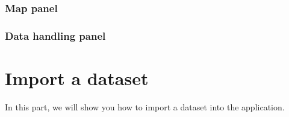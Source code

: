 \documentclass[]{book}
\begin{document}
\hypertarget{map-panel}{%
\subsection{Map panel}\label{map-panel}}

\hypertarget{data-handling-panel}{%
\subsection{Data handling panel}\label{data-handling-panel}}

\hypertarget{import-a-dataset}{%
\chapter{Import a dataset}\label{import-a-dataset}}

In this part, we will show you how to import a dataset into the application.


\end{document}

